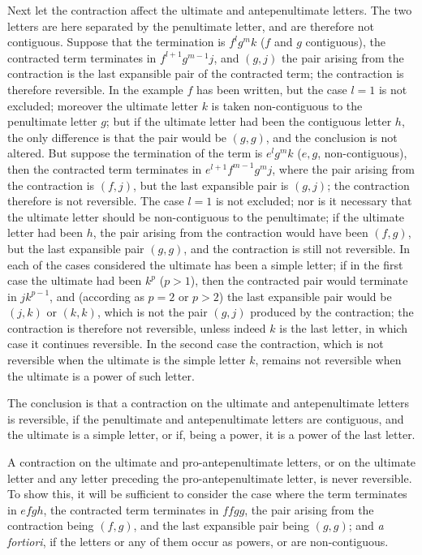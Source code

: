 \documentclass[11pt,a4paper]{article}
\theoremstyle{definition}
\begin{document}
Next let the contraction affect the ultimate and antepenultimate letters. The two letters are here separated by the penultimate letter, and are therefore not contiguous. Suppose that the termination is $f^lg^mk$ ($f$ and $g$ contiguous), the contracted term terminates in $f^{l+1}g^{m-1}j$, and $(g,j)$ the pair arising from the contraction is the last expansible pair of the contracted term; the contraction is therefore reversible. In the example $f$ has been written, but the case $l=1$ is not excluded; moreover the ultimate letter $k$ is taken non-contiguous to the penultimate letter $g$; but if the ultimate letter had been the contiguous letter $h$, the only difference is that the pair would be $(g,g)$, and the conclusion is not altered. But suppose the termination of the term is $e^lg^mk$ ($e,g$, non-contiguous), then the contracted term terminates in $e^{l+1}f^{m-1}g^mj$, where the pair arising from the contraction is $(f,j)$, but the last expansible pair is $(g,j)$; the contraction therefore is not reversible. The case $l=1$ is not excluded; nor is it necessary that the ultimate letter should be non-contiguous to the penultimate; if the ultimate letter had been $h$, the pair arising from the contraction would have been $(f,g)$, but the last expansible pair $(g,g)$, and the contraction is still not reversible. In each of the cases considered the ultimate has been a simple letter; if in the first case the ultimate had been $k^p$ ($p>1$), then the contracted pair would terminate in $jk^{p-1}$, and (according as $p=2$ or $p>2$) the last expansible pair would be $(j,k)$ or $(k,k)$, which is not the pair $(g,j)$ produced by the contraction; the contraction is therefore not reversible, unless indeed $k$ is the last letter, in which case it continues reversible. In the second case the contraction, which is not reversible when the ultimate is the simple letter $k$, remains not reversible when the ultimate is a power of such letter.

The conclusion is that a contraction on the ultimate and antepenultimate letters is reversible, if the penultimate and antepenultimate letters are contiguous, and the ultimate is a simple letter, or if, being a power, it is a power of the last letter.

A contraction on the ultimate and pro-antepenultimate letters, or on the ultimate letter and any letter preceding the pro-antepenultimate letter, is never reversible. To show this, it will be sufficient to consider the case where the term terminates in $efgh$, the contracted term terminates in $ffgg$, the pair arising from the contraction being $(f,g)$, and the last expansible pair being $(g,g)$; and \textit{a fortiori}, if the letters or any of them occur as powers, or are non-contiguous.
\end{document}
